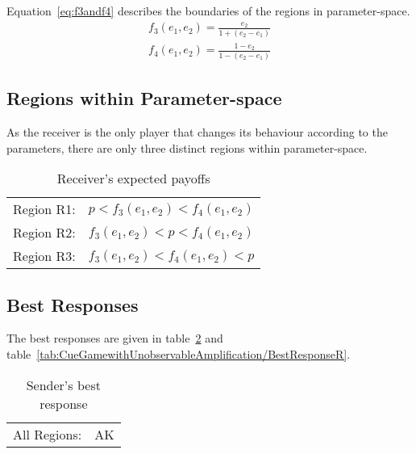 \documentclass[a4paper,12pt]{article}
\numberwithin{equation}{section}
\begin{document}
Equation~\ref{eq:f3andf4} describes the boundaries of the regions in parameter-space.
\begin{subequations}
\label{eq:f3andf4}
\begin{gather}
f_{3}(e_{1},e_{2})=\frac{e_{2}}{1+(e_{2}-e_{1})}\\
f_{4}(e_{1},e_{2})=\frac{1-e_{2}}{1-(e_{2}-e_{1})}
\end{gather}
\end{subequations}

\newpage


\subsection{Regions within Parameter-space}
\label{sec:Cue Game with Unobservable Amplification/Regions}

As the receiver is the only player that changes its behaviour according to the parameters, there are only three distinct regions within parameter-space.

\begin{table}[h]
\begin{center}
\begin{tabular}{lc}
Region R1: & $p<f_{3}(e_{1},e_{2})<f_{4}(e_{1},e_{2})$\\
Region R2: & $f_{3}(e_{1},e_{2})<p<f_{4}(e_{1},e_{2})$\\
Region R3: & $f_{3}(e_{1},e_{2})<f_{4}(e_{1},e_{2})<p$
\end{tabular}
\end{center}
\caption{Receiver's expected payoffs}
\label{tab:CueGamewithUnobservableAmplification/RegionsR}
\end{table}


\subsection{Best Responses}
\label{sec:Cue Game with Unobservable Amplification/Best Response}

The best responses are given in table~\ref{tab:CueGamewithUnobservableAmplification/BestResponseS} and table~\ref{tab:CueGamewithUnobservableAmplification/BestResponseR}.

\begin{table}[h]
\begin{center}
\begin{tabular}{lc}
All Regions: & AK
\end{tabular}
\end{center}
\caption{Sender's best response}
\label{tab:CueGamewithUnobservableAmplification/BestResponseS}
\end{table}
\end{document}
